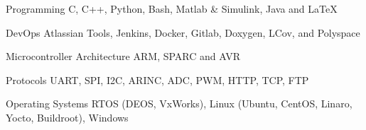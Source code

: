 

\begin{cvskills}

  \cvskill
    {Programming} %
	{C, C++, Python, Bash, Matlab \& Simulink, Java and LaTeX} %

%

%
  \cvskill
    {DevOps} %
    {Atlassian Tools, Jenkins, Docker, Gitlab, Doxygen, LCov, and Polyspace} %

  \cvskill
    {Microcontroller Architecture} %
    {ARM, SPARC and AVR} %

  \cvskill
    {Protocols} %
	{UART, SPI, I2C, ARINC, ADC, PWM, HTTP, TCP, FTP} %

  \cvskill
    {Operating Systems} %
	{RTOS (DEOS, VxWorks), Linux (Ubuntu, CentOS, Linaro, Yocto, Buildroot), Windows} %


\end{cvskills}
